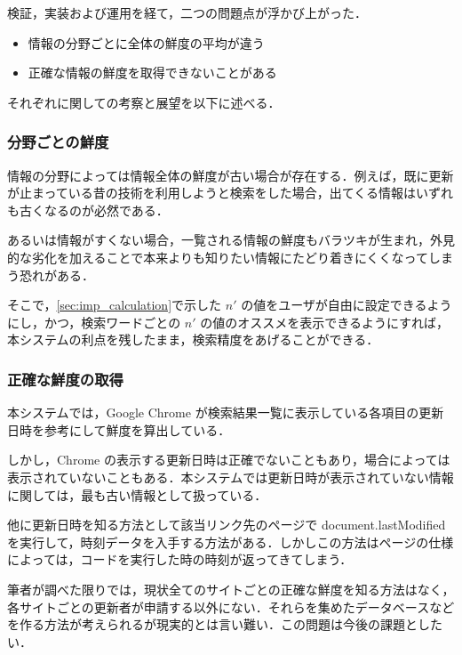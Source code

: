 検証，実装および運用を経て，二つの問題点が浮かび上がった．

\begin{itemize}
  \item 情報の分野ごとに全体の鮮度の平均が違う
  \item 正確な情報の鮮度を取得できないことがある
\end{itemize}

それぞれに関しての考察と展望を以下に述べる．

\subsubsection{分野ごとの鮮度}

情報の分野によっては情報全体の鮮度が古い場合が存在する．例えば，既に更新が止まっている昔の技術を利用しようと検索をした場合，出てくる情報はいずれも古くなるのが必然である．

あるいは情報がすくない場合，一覧される情報の鮮度もバラツキが生まれ，外見的な劣化を加えることで本来よりも知りたい情報にたどり着きにくくなってしまう恐れがある．

そこで，\ref{sec:imp_calculation}で示した $n'$ の値をユーザが自由に設定できるようにし，かつ，検索ワードごとの $n'$ の値のオススメを表示できるようにすれば，本システムの利点を残したまま，検索精度をあげることができる．

\subsubsection{正確な鮮度の取得}

本システムでは，Google Chrome が検索結果一覧に表示している各項目の更新日時を参考にして鮮度を算出している．

しかし，Chrome の表示する更新日時は正確でないこともあり，場合によっては表示されていないこともある．本システムでは更新日時が表示されていない情報に関しては，最も古い情報として扱っている．

他に更新日時を知る方法として該当リンク先のページで document.lastModified を実行して，時刻データを入手する方法がある．しかしこの方法はページの仕様によっては，コードを実行した時の時刻が返ってきてしまう．

筆者が調べた限りでは，現状全てのサイトごとの正確な鮮度を知る方法はなく，各サイトごとの更新者が申請する以外にない．それらを集めたデータベースなどを作る方法が考えられるが現実的とは言い難い．この問題は今後の課題としたい．
